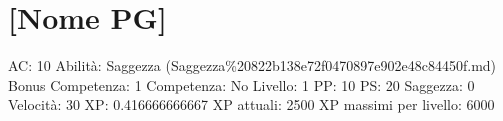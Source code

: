 \section{{[}Nome PG{]}}\label{nome-pg}

AC: 10 Abilità: Saggezza
(Saggezza\%20822b138e72f0470897e902e48c84450f.md) Bonus Competenza: 1
Competenza: No Livello: 1 PP: 10 PS: 20 Saggezza: 0 Velocità: 30 XP:
0.416666666667 XP attuali: 2500 XP massimi per livello: 6000
